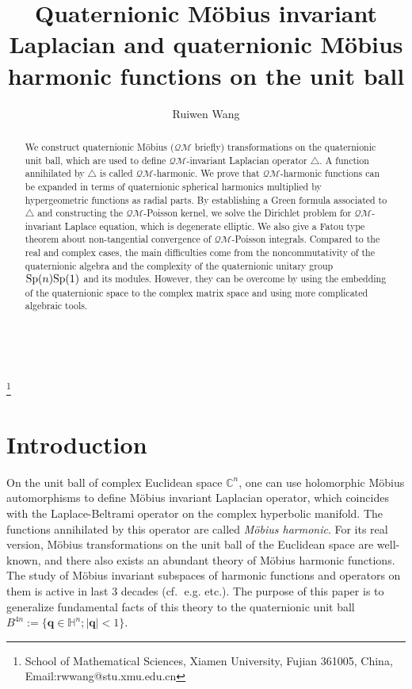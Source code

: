 \documentclass[a4paper,11pt]{amsart}
\numberwithin{equation}{section}
\begin{document}
\title[Quaternionic M\"{o}bius invariant Laplacian and harmonic functions]{Quaternionic M\"{o}bius invariant Laplacian and quaternionic M\"{o}bius harmonic functions on the unit ball}
\author{Ruiwen Wang}
\thanks{School of Mathematical Sciences, Xiamen University, Fujian 361005, China, Email:rwwang@stu.xmu.edu.cn}
\begin{abstract}
We construct quaternionic M\"{o}bius ($\mathcal{QM}$ briefly) transformations on the quaternionic unit ball, which are used to define $\mathcal{QM}$-invariant Laplacian operator $\triangle$. A function annihilated by $\triangle$ is called $\mathcal{QM}$-harmonic. We prove that $\mathcal{QM}$-harmonic functions can be expanded in terms of quaternionic spherical harmonics multiplied by hypergeometric functions as radial parts. By establishing a Green formula associated to $\triangle$ and constructing the $\mathcal{QM}$-Poisson kernel, we solve the Dirichlet problem for $\mathcal{QM}$-invariant Laplace equation, which is degenerate elliptic. We also give a Fatou type theorem about non-tangential convergence of $\mathcal{QM}$-Poisson integrals. Compared to the real and complex cases, the main  difficulties come from the noncommutativity of the quaternionic algebra and the complexity of the quaternionic unitary group ${\rm Sp}(n){\rm Sp}(1)$ and its modules. However, they can be overcome by using the embedding of the quaternionic space to the complex matrix space and using more complicated algebraic tools.
\\ \par\

\end{abstract}

\maketitle
\section{Introduction}

On the unit ball of complex Euclidean space $\mathbb{C}^n$, one can use holomorphic M\"{o}bius automorphisms to define M\"{o}bius invariant Laplacian operator, which coincides with the Laplace-Beltrami operator on the complex hyperbolic manifold. The functions annihilated by this operator are called {\it M\"{o}bius harmonic}. For its real version, M\"{o}bius transformations on the unit ball of the Euclidean space are well-known, and there also exists an abundant theory of M\"{o}bius harmonic functions. The study of M\"{o}bius invariant subspaces of harmonic functions and operators on them is active in last 3 decades (cf.$\;$ e.g. \cite{Ahern,Liu1,Liu2,Liu3,Ou2,Rudin,Stoll,wulan,Xia} etc.). The purpose of this paper is to generalize fundamental facts of this theory to the quaternionic unit ball $B^{4n}:=\{\mathbf{q}\in \mathbb{H}^n;|\mathbf{q}|<1\}$.
\end{document}
